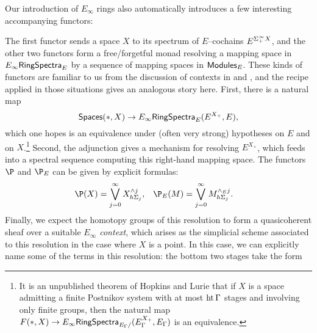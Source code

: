 Our introduction of $E_\infty$ rings also automatically introduces a few interesting accompanying functors:
\begin{center}
\end{center}
The first functor sends a space $X$ to its spectrum of $E$--cochains $E^{\Sigma^\infty_+ X}$, and the other two functors form a free/forgetful monad resolving a mapping space in $E_\infty\mathsf{RingSpectra}_E$ by a sequence of mapping spaces in $\mathsf{Modules}_E$.  These kinds of functors are familiar to us from the discussion of contexts in  and , and the recipe applied in those situations gives an analogous story here.  First, there is a natural map \[\mathsf{Spaces}(*, X) \to E_\infty\mathsf{RingSpectra}_E(E^{X_+}, E),\] which one hopes is an equivalence under (often very strong) hypotheses on $E$ and on $X$.\footnote{It is an unpublished theorem of Hopkins and Lurie that if $X$ is a space admitting a finite Postnikov system with at most $\operatorname{ht} \Gamma$ stages and involving only finite groups, then the natural map $F(*, X) \to E_\infty\mathsf{RingSpectra}_{E_\Gamma/}(E_\Gamma^{X_+}, E_\Gamma)$ is an equivalence.}  Second, the adjunction gives a mechanism for resolving $E^{X_+}$, which feeds into a spectral sequence computing this right-hand mapping space.  The functors $\P$ and $\P_E$ can be given by explicit formulas:
\begin{align*}
\P(X) & = \bigvee_{j=0}^\infty X^{\sm j}_{h\Sigma_j}, &
\P_E(M) & = \bigvee_{j=0}^\infty M^{\sm_E j}_{h\Sigma_j}.
\end{align*}
Finally, we expect the homotopy groups of this resolution to form a quasicoherent sheaf over a suitable \emph{$E_\infty$ context}, which arises as the simplicial scheme associated to this resolution in the case where $X$ is a point.  In this case, we can explicitly name some of the terms in this resolution: the bottom two stages take the form
\begin{center}
\end{center}
